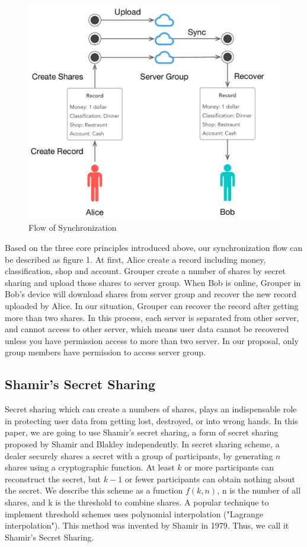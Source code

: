 \documentclass[twocolumn,10pt]{article}
\begin{document}
\begin{figure}[t]
\centering
\includegraphics[scale=0.4]{sync_flow}
\caption{Flow of Synchronization}
\end{figure}
Based on the three core principles introduced above, our synchronization flow can be described as figure 1. At first, Alice create a record including money, classification, shop and account. Grouper create a number of shares by secret sharing and upload those shares to server group. When Bob is online, Grouper in Bob's device will download shares from server group and recover the new record uploaded by Alice. In our situation, Grouper can recover the record after getting more than two shares. In this process, each server is separated from other server, and cannot access to other server, which means user data cannot be recovered unless you have permission access to more than two server. In our proposal, only group members have permission to access server group.


\subsection{Shamir's Secret Sharing}
Secret sharing which can create a numbers of shares, plays an indispensable role in protecting user data from getting lost, destroyed, or into wrong hands. In this paper, we are going to use Shamir's secret sharing, a form of secret sharing proposed by Shamir and Blakley independently. In secret sharing scheme, a dealer securely shares a secret with a group of participants, by generating $n$ shares using a cryptographic function\cite{smith2013layered}. At least $k$ or more participants can reconstruct the secret, but $k-1$ or fewer participants can obtain nothing about the secret\cite{pang2005new}. We describe this scheme as a function $f(k, n)$, n is the number of all shares, and k is the threshold to combine shares. A popular technique to implement threshold schemes uses polynomial interpolation ("Lagrange interpolation"). This method was invented by Shamir in 1979. Thus, we call it Shamir's Secret Sharing.
\end{document}
